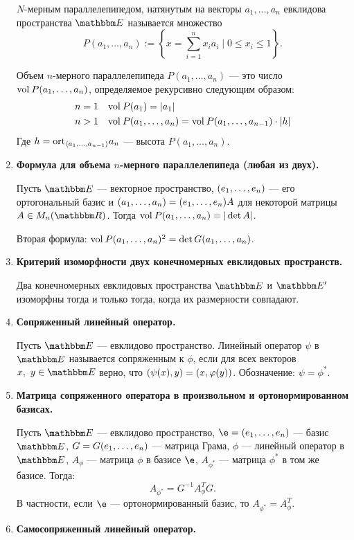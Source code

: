 \begin{enumerate}
$N$-мерным параллелепипедом, натянутым на векторы $a_1, \ldots, a_n$ евклидова пространства $\E$ называется множество 
$$
P(a_1, \ldots, a_n) := \left\{ x = \sum_{i = 1}^n x_ia_i \mid 0 \leqslant x_i \leqslant 1 \right\}.
$$  

Объем $n$-мерного параллелепипеда $P(a_1, \ldots, a_{n})$ --- это число $\mathrm{vol\:} P(a_1, \ldots, a_{n})$, определяемое рекурсивно следующим образом:
\begin{align*}
n = 1 \quad& \mathrm{vol\:} P(a_1) = |a_1| \\
n > 1 \quad& \mathrm{vol\:} P(a_1, \ldots, a_n) = \mathrm{vol\:} P(a_1, \ldots, a_{n-1})\cdot |h|
\end{align*}
Где $h = \mathrm{ort}_{\langle a_1, \ldots, a_{n-1}\rangle}a_n$ --- высота $P(a_1, \ldots, a_n)$.

\item \textbf{Формула для объема $n$-мерного параллелепипеда (любая из двух).}

Пусть $\E$ --- векторное пространство, $({e}_1, \ldots, {e}_n)$ --- его ортогональный базис и $\vector{a} \hm= \vector{e}A$ для некоторой матрицы $A \in M_n(\R)$. Тогда $\mathrm{vol\:} P({a}_1, \ldots, {a}_n) = |\det A|$.

Вторая формула: $\mathrm{vol\:} P({a}_1, \ldots, {a}_n)^2 = \det G({a}_1, \ldots, {a}_n)$.

\item \textbf{Критерий изоморфности двух конечномерных евклидовых пространств.}

Два конечномерных евклидовых пространства $\E$ и $\E'$ изоморфны тогда и только тогда, когда их размерности совпадают.

\item \textbf{Сопряженный линейный оператор.}

Пусть $\E$ --- евклидово пространство. Линейный оператор $\psi$ в $\E$ называется сопряженным к $\phi$, если для всех векторов $x,\ y \in \E$ верно, что $(\psi(x), y)\hm = (x, \phi(y))$.  Обозначение: $\psi = \phi^*$.

\item \textbf{Матрица сопряженного оператора в произвольном и ортонормированном базисах.}

Пусть $\E$ --- евклидово пространство, $\e = \vector{e}$ --- базис $\E$, $G = G({e}_1, \ldots, {e}_n)$ --- матрица Грама, $\phi$ --- линейный оператор в $\E$, $A_\phi$ --- матрица $\phi$ в базисе $\e$, $A_{\phi^*}$ --- матрица $\phi^*$ в том же базисе. Тогда:
$$
A_{\phi^*} = G^{-1}A_\phi^TG.
$$
В частности, если $\e$ --- ортонормированный базис, то $A_{\phi^*} = A_{\phi}^T$.

\item \textbf{Самосопряженный линейный оператор.}


\end{enumerate}
